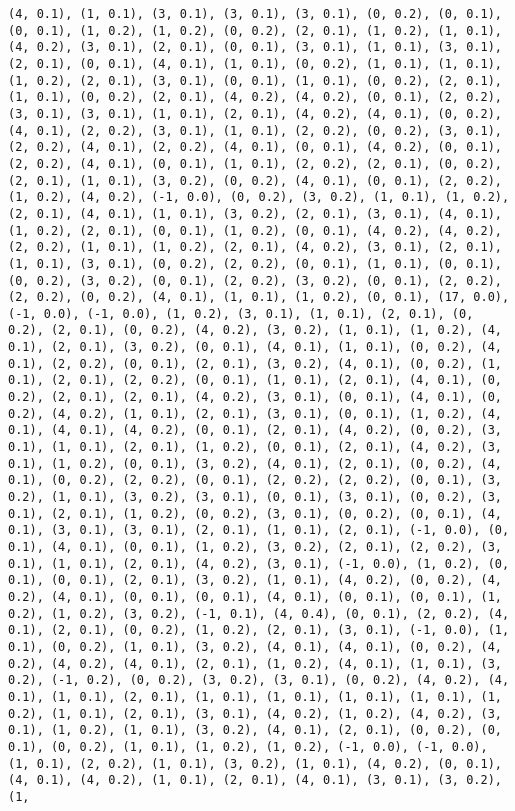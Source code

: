\documentclass[11pt]{article}
\begin{document}
\begin{Verbatim}[commandchars=\\\{\}]
(4, 0.1), (1, 0.1), (3, 0.1), (3, 0.1), (3, 0.1), (0, 0.2), (0, 0.1), (0, 0.1), (1, 0.2), (1, 0.2), (0, 0.2), (2, 0.1), (1, 0.2), (1, 0.1), (4, 0.2), (3, 0.1), (2, 0.1), (0, 0.1), (3, 0.1), (1, 0.1), (3, 0.1), (2, 0.1), (0, 0.1), (4, 0.1), (1, 0.1), (0, 0.2), (1, 0.1), (1, 0.1), (1, 0.2), (2, 0.1), (3, 0.1), (0, 0.1), (1, 0.1), (0, 0.2), (2, 0.1), (1, 0.1), (0, 0.2), (2, 0.1), (4, 0.2), (4, 0.2), (0, 0.1), (2, 0.2), (3, 0.1), (3, 0.1), (1, 0.1), (2, 0.1), (4, 0.2), (4, 0.1), (0, 0.2), (4, 0.1), (2, 0.2), (3, 0.1), (1, 0.1), (2, 0.2), (0, 0.2), (3, 0.1), (2, 0.2), (4, 0.1), (2, 0.2), (4, 0.1), (0, 0.1), (4, 0.2), (0, 0.1), (2, 0.2), (4, 0.1), (0, 0.1), (1, 0.1), (2, 0.2), (2, 0.1), (0, 0.2), (2, 0.1), (1, 0.1), (3, 0.2), (0, 0.2), (4, 0.1), (0, 0.1), (2, 0.2), (1, 0.2), (4, 0.2), (-1, 0.0), (0, 0.2), (3, 0.2), (1, 0.1), (1, 0.2), (2, 0.1), (4, 0.1), (1, 0.1), (3, 0.2), (2, 0.1), (3, 0.1), (4, 0.1), (1, 0.2), (2, 0.1), (0, 0.1), (1, 0.2), (0, 0.1), (4, 0.2), (4, 0.2), (2, 0.2), (1, 0.1), (1, 0.2), (2, 0.1), (4, 0.2), (3, 0.1), (2, 0.1), (1, 0.1), (3, 0.1), (0, 0.2), (2, 0.2), (0, 0.1), (1, 0.1), (0, 0.1), (0, 0.2), (3, 0.2), (0, 0.1), (2, 0.2), (3, 0.2), (0, 0.1), (2, 0.2), (2, 0.2), (0, 0.2), (4, 0.1), (1, 0.1), (1, 0.2), (0, 0.1), (17, 0.0), (-1, 0.0), (-1, 0.0), (1, 0.2), (3, 0.1), (1, 0.1), (2, 0.1), (0, 0.2), (2, 0.1), (0, 0.2), (4, 0.2), (3, 0.2), (1, 0.1), (1, 0.2), (4, 0.1), (2, 0.1), (3, 0.2), (0, 0.1), (4, 0.1), (1, 0.1), (0, 0.2), (4, 0.1), (2, 0.2), (0, 0.1), (2, 0.1), (3, 0.2), (4, 0.1), (0, 0.2), (1, 0.1), (2, 0.1), (2, 0.2), (0, 0.1), (1, 0.1), (2, 0.1), (4, 0.1), (0, 0.2), (2, 0.1), (2, 0.1), (4, 0.2), (3, 0.1), (0, 0.1), (4, 0.1), (0, 0.2), (4, 0.2), (1, 0.1), (2, 0.1), (3, 0.1), (0, 0.1), (1, 0.2), (4, 0.1), (4, 0.1), (4, 0.2), (0, 0.1), (2, 0.1), (4, 0.2), (0, 0.2), (3, 0.1), (1, 0.1), (2, 0.1), (1, 0.2), (0, 0.1), (2, 0.1), (4, 0.2), (3, 0.1), (1, 0.2), (0, 0.1), (3, 0.2), (4, 0.1), (2, 0.1), (0, 0.2), (4, 0.1), (0, 0.2), (2, 0.2), (0, 0.1), (2, 0.2), (2, 0.2), (0, 0.1), (3, 0.2), (1, 0.1), (3, 0.2), (3, 0.1), (0, 0.1), (3, 0.1), (0, 0.2), (3, 0.1), (2, 0.1), (1, 0.2), (0, 0.2), (3, 0.1), (0, 0.2), (0, 0.1), (4, 0.1), (3, 0.1), (3, 0.1), (2, 0.1), (1, 0.1), (2, 0.1), (-1, 0.0), (0, 0.1), (4, 0.1), (0, 0.1), (1, 0.2), (3, 0.2), (2, 0.1), (2, 0.2), (3, 0.1), (1, 0.1), (2, 0.1), (4, 0.2), (3, 0.1), (-1, 0.0), (1, 0.2), (0, 0.1), (0, 0.1), (2, 0.1), (3, 0.2), (1, 0.1), (4, 0.2), (0, 0.2), (4, 0.2), (4, 0.1), (0, 0.1), (0, 0.1), (4, 0.1), (0, 0.1), (0, 0.1), (1, 0.2), (1, 0.2), (3, 0.2), (-1, 0.1), (4, 0.4), (0, 0.1), (2, 0.2), (4, 0.1), (2, 0.1), (0, 0.2), (1, 0.2), (2, 0.1), (3, 0.1), (-1, 0.0), (1, 0.1), (0, 0.2), (1, 0.1), (3, 0.2), (4, 0.1), (4, 0.1), (0, 0.2), (4, 0.2), (4, 0.2), (4, 0.1), (2, 0.1), (1, 0.2), (4, 0.1), (1, 0.1), (3, 0.2), (-1, 0.2), (0, 0.2), (3, 0.2), (3, 0.1), (0, 0.2), (4, 0.2), (4, 0.1), (1, 0.1), (2, 0.1), (1, 0.1), (1, 0.1), (1, 0.1), (1, 0.1), (1, 0.2), (1, 0.1), (2, 0.1), (3, 0.1), (4, 0.2), (1, 0.2), (4, 0.2), (3, 0.1), (1, 0.2), (1, 0.1), (3, 0.2), (4, 0.1), (2, 0.1), (0, 0.2), (0, 0.1), (0, 0.2), (1, 0.1), (1, 0.2), (1, 0.2), (-1, 0.0), (-1, 0.0), (1, 0.1), (2, 0.2), (1, 0.1), (3, 0.2), (1, 0.1), (4, 0.2), (0, 0.1), (4, 0.1), (4, 0.2), (1, 0.1), (2, 0.1), (4, 0.1), (3, 0.1), (3, 0.2), (1, 
\end{Verbatim}
\end{document}
